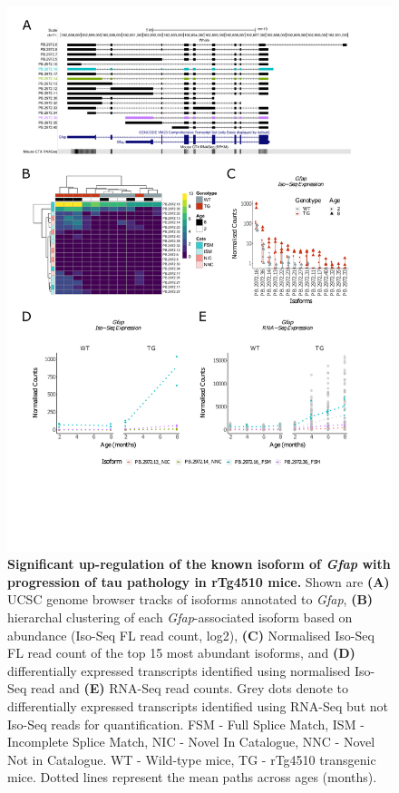 \begin{figure}[!htp]
	\centering
	\includegraphics[page=1,trim={0.5cm 4.8cm 2cm 1cm}, scale = 0.85]{Figures/Ch5_DiffPlots.pdf}
	\captionsetup{width=0.95\textwidth}
	\caption[Differential \textit{Gfap} transcript expression in rTg4510 mice]%
	{\textbf{Significant up-regulation of the known isoform of \textit{Gfap} with progression of tau pathology in rTg4510 mice.} Shown are \textbf{(A)} UCSC genome browser tracks of isoforms annotated to \textit{Gfap}, \textbf{(B)} hierarchal clustering of each \textit{Gfap}-associated isoform based on abundance (Iso-Seq FL read count, log2), \textbf{(C)} Normalised Iso-Seq FL read count of the top 15 most abundant isoforms, and \textbf{(D)} differentially expressed transcripts identified using normalised Iso-Seq read and \textbf{(E)} RNA-Seq read counts. Grey dots denote to differentially expressed transcripts identified using RNA-Seq but not Iso-Seq reads for quantification. FSM - Full Splice Match, ISM - Incomplete Splice Match, NIC - Novel In Catalogue, NNC - Novel Not in Catalogue. WT - Wild-type mice, TG - rTg4510 transgenic mice. Dotted lines represent the mean paths across ages (months).} 
	\label{fig:DEI_gfap}
\end{figure}


